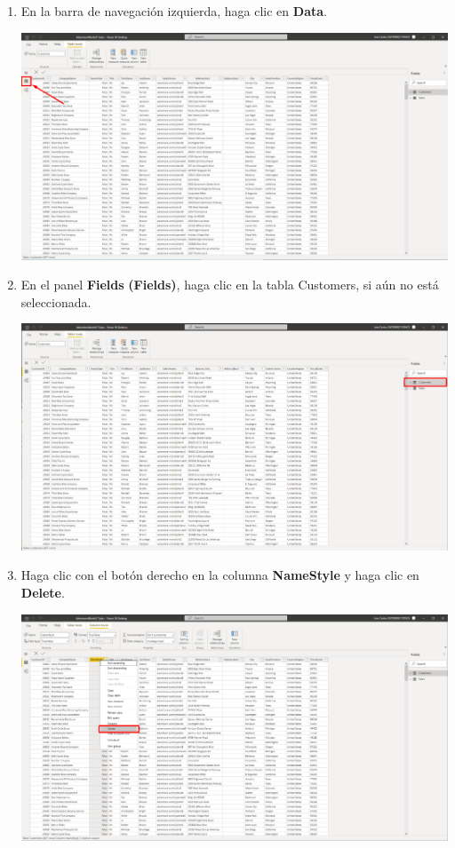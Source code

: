 \documentclass[12pt,letterpaper]{article}
\newcommand\tab[1][1cm]{\hspace*{#1}}
\begin{document}
\begin{enumerate}[\tab 1.]
\begin{center}
        \end{center}
        \item En la barra de navegación izquierda, haga clic en \textbf{Data}.
        \begin{center}
            \includegraphics[width=13cm]{./img/img17.png}
        \end{center}
        \item En el panel \textbf{Fields} \textbf{(Fields)}, haga clic en la tabla Customers, si aún no está seleccionada.
        \begin{center}
            \includegraphics[width=13cm]{./img/img18.png}
        \end{center}
        \item Haga clic con el botón derecho en la columna \textbf{NameStyle} y haga clic en \textbf{Delete}.
        \begin{center}
            \includegraphics[width=13cm]{./img/img19.png}

\end{center}
\end{enumerate}
\end{document}
